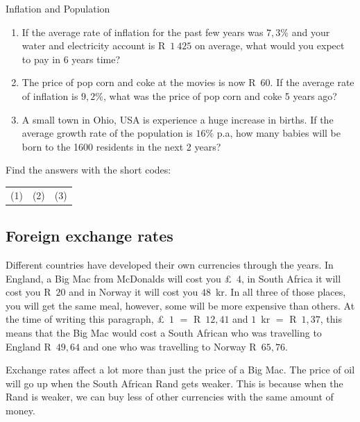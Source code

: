\begin{exercises}{Inflation and Population}
    \begin{enumerate}[label=\textbf{\arabic*}.]
	\item If the average rate of inflation for the past few years was $7,3\%$ and your water and electricity account is R~$1~425$ on average, what would you expect to pay in 6 years time?

	\item The price of pop corn and coke at the movies is now R~$60$. If the average rate of inflation is $9,2\%$, what was the price of pop corn and coke 5 years ago?

	\item A small town in Ohio, USA is experience a huge increase in births. If the average growth rate of the population is $16\%$ p.a, how many babies will be born to the 1600 residents in the next 2 years?\\
    \end{enumerate}

    Find the answers with the short codes:\\
    \begin{tabularx}{\textwidth}{ XXX }
	(1)	&	(2)	&	(3)\\
    \end{tabularx}
\end{exercises}



\subsection{Foreign exchange rates}

Different countries have developed their own currencies through the years. In England, a Big Mac from McDonalds will cost you £~$4$, in South Africa it will cost you R~$20$ and in Norway it will cost you $48$~kr. In all three of those places, you will get the same meal, however, some will be more expensive than others. At the time of writing this paragraph, £~$1$ $=$ R~$12,41$ and $1$~kr $=$ R~$1,37$, this means that the Big Mac would cost a South African who was travelling to England R~$49,64$ and one who was travelling to Norway R~$65,76$.\par

Exchange rates affect a lot more than just the price of a Big Mac. The price of oil will go up when the South African Rand gets weaker. This is because when the Rand is weaker, we can buy less of other currencies with the same amount of money.\par

